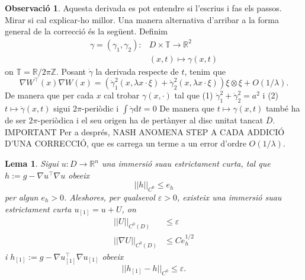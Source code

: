 \documentclass[11pt,a4paper,openright,oneside]{book}
\numberwithin{equation}{section}
\newtheorem{lema}[teo]{Lema}
\theoremstyle{definition}
\newtheorem{obs}[teo]{Observaci\'o}
\begin{document}
\begin{obs}
    {\color{blue} Aquesta derivada es pot entendre si l'escrius i fas els passos. Mirar si cal explicar-ho millor.}
    Una manera alternativa d'arribar a la forma general de la correcció és la següent. Definim 
    \begin{equation*}
        \begin{aligned}
        \gamma = (\gamma_1, \gamma_2) : &D\times \mathbb T\to \mathbb R^2\\
        & (x,t)\mapsto \gamma(x,t)
        \end{aligned}
    \end{equation*}
    on $\mathbb T = \mathbb R / 2\pi\mathbb Z$.
    Posant $\dot\gamma$ la derivada respecte de $t$, tenim que
    \begin{equation*}
        \nabla W ^{\intercal}(x) \nabla W(x) = \left( \dot\gamma_1^2(x, \lambda x\cdot\xi) + \dot\gamma_2^2(x, \lambda x\cdot\xi) \right)\xi\otimes\xi + O(1/\lambda).
    \end{equation*}
    De manera que per cada $x$ cal trobar $\gamma(x,\cdot)$ tal que 
    (1) $\dot\gamma_1^2 + \dot\gamma_2^2 = a^2$ i 
    (2) $t\mapsto \dot\gamma(x,t)$ sigui $2\pi$-periòdic i $\int\dot\gamma\text{d}t = 0$
    De manera que $t\mapsto\gamma(x,t)$ també ha de ser $2\pi$-periòdica i el seu origen ha de pertànyer al disc unitat tancat $\overline D$.
    {\color{blue} IMPORTANT Per a després, NASH ANOMENA STEP A CADA ADDICIÓ D'UNA CORRECCIÓ, que es carrega un terme a un error d'ordre $O(1/\lambda)$. }
\end{obs}
\begin{lema}
    Sigui $u:D\to\mathbb R^n$ una immersió suau estrictament curta, tal que $h:=g-\nabla u ^{\intercal}\nabla u$ obeeix
    \begin{equation*}
        ||h||_{C^0} \le e_h
    \end{equation*}
    per algun $e_h > 0$. Aleshores, per qualsevol $\varepsilon > 0$, existeix una immersió suau estrictament curta $u_{[1]} = u + U$, on
    \begin{equation*}
        \begin{aligned}
        ||U||_{C^0(D)} &\le \varepsilon\\
        ||\nabla U||_{C^0(D)} &\le Ce_h^{1/2}
        \end{aligned}
    \end{equation*}
    i $h_{[1]}:=g-\nabla u_{[1]}^{\intercal}\nabla u_{[1]}$ obeeix
    \begin{equation*}
        ||h_{[1]}-h||_{C^0} \le \varepsilon.
    \end{equation*}
\end{lema}
\end{document}
